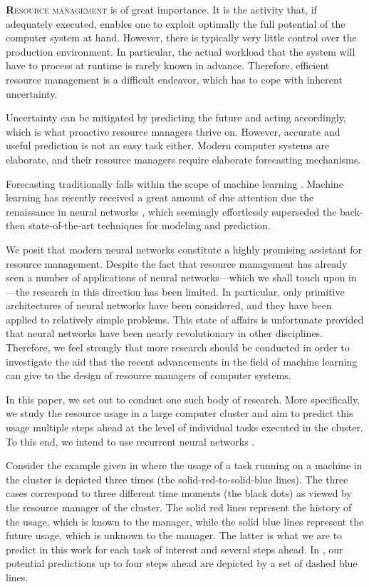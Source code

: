 \lettrine[findent=0.2em, nindent=0em]{\textbf{R}}{esource management} is of
great importance. It is the activity that, if adequately executed, enables one
to exploit optimally the full potential of the computer system at hand. However,
there is typically very little control over the production environment. In
particular, the actual workload that the system will have to process at runtime
is rarely known in advance. Therefore, efficient resource management is a
difficult endeavor, which has to cope with inherent uncertainty.

Uncertainty can be mitigated by predicting the future and acting accordingly,
which is what proactive resource managers thrive on. However, accurate and
useful prediction is not an easy task either. Modern computer systems are
elaborate, and their resource managers require elaborate forecasting mechanisms.

Forecasting traditionally falls within the scope of machine learning
\cite{hastie2009}. Machine learning has recently received a great amount of due
attention due the renaissance in neural networks \cite{goodfellow2016}, which
seemingly effortlessly superseded the back-then state-of-the-art techniques for
modeling and prediction.

We posit that modern neural networks constitute a highly promising assistant for
resource management. Despite the fact that resource management has already seen
a number of applications of neural networks---which we shall touch upon in
---the research in this direction has been limited. In
particular, only primitive architectures of neural networks have been
considered, and they have been applied to relatively simple problems. This state
of affairs is unfortunate provided that neural networks have been nearly
revolutionary in other disciplines. Therefore, we feel strongly that more
research should be conducted in order to investigate the aid that the recent
advancements in the field of machine learning can give to the design of resource
managers of computer systems.

In this paper, we set out to conduct one such body of research. More
specifically, we study the resource usage in a large computer cluster and aim to
predict this usage multiple steps ahead at the level of individual tasks
executed in the cluster. To this end, we intend to use recurrent neural networks
\cite{goodfellow2016}.

Consider the example given in  where the  usage of a task
running on a machine in the cluster is depicted three times (the
solid-red-to-solid-blue lines). The three cases correspond to three different
time moments (the black dots) as viewed by the resource manager of the cluster.
The solid red lines represent the history of the usage, which is known to the
manager, while the solid blue lines represent the future usage, which is unknown
to the manager. The latter is what we are to predict in this work for each task
of interest and several steps ahead. In , our potential
predictions up to four steps ahead are depicted by a set of dashed blue lines.


